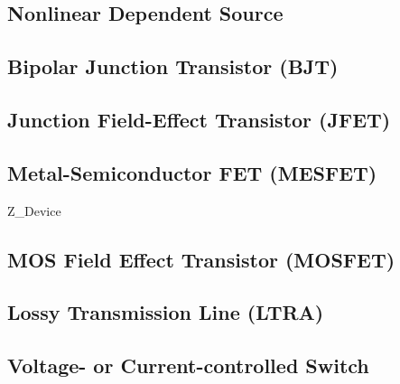 \clearpage
\subsection{Nonlinear Dependent Source}
\label{B_Source_Device}
 
 


\clearpage
\subsection{Bipolar Junction Transistor (BJT)}
 


\clearpage
\subsection{Junction Field-Effect Transistor (JFET)}
 


\clearpage
\subsection{Metal-Semiconductor FET (MESFET)}
 
 {Z_Device}

\clearpage
\subsection{MOS Field Effect Transistor (MOSFET)}
 


\clearpage
\subsection{Lossy Transmission Line (LTRA)}
 


\clearpage
\subsection{Voltage- or Current-controlled Switch}
 


\clearpage

